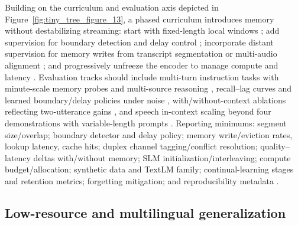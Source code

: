 \documentclass{article}
\begin{document}
Building on the curriculum and evaluation axis depicted in Figure~\ref{fig:tiny_tree_figure_13}, a phased curriculum introduces memory without destabilizing streaming: start with fixed-length local windows \cite{hsu2024exploringcontextlearningtextlessspeechla}; add supervision for boundary detection and delay control \cite{guo2025streamuniachievingstreamingspeechtransla}; incorporate distant supervision for memory writes from transcript segmentation or multi-audio alignment \cite{huang2025dynamicsuperbphase2collaborativelyexpand}; and progressively unfreeze the encoder to manage compute and latency \cite{nguyen2025qwenvsgemmaintegrationwhispercomparative}. Evaluation tracks should include multi-turn instruction tasks with minute-scale memory probes and multi-source reasoning \cite{huang2025dynamicsuperbphase2collaborativelyexpand}, recall--lag curves and learned boundary/delay policies under noise \cite{guo2025streamuniachievingstreamingspeechtransla}, with/without-context ablations reflecting two-utterance gains \cite{li2025seewossubmissionmlcslmlessonslearnedspee}, and speech in-context scaling beyond four demonstrations with variable-length prompts \cite{hsu2024exploringcontextlearningtextlessspeechla}. Reporting minimums: segment size/overlap; boundary detector and delay policy; memory write/eviction rates, lookup latency, cache hits; duplex channel tagging/conflict resolution; quality--latency deltas with/without memory; SLM initialization/interleaving; compute budget/allocation; synthetic data and TextLM family; continual-learning stages and retention metrics; forgetting mitigation; and reproducibility metadata \cite{maimon2025scalinganalysisinterleavedspeechtextlang,hsiao2025analyzingmitigationstrategiescatastrophi,chen2023reducingbarriersselfsupervisedlearninghu}.

\subsection{Low-resource and multilingual generalization} \label{subsec:low-resourceandmultilingualgeneralization}
\end{document}
